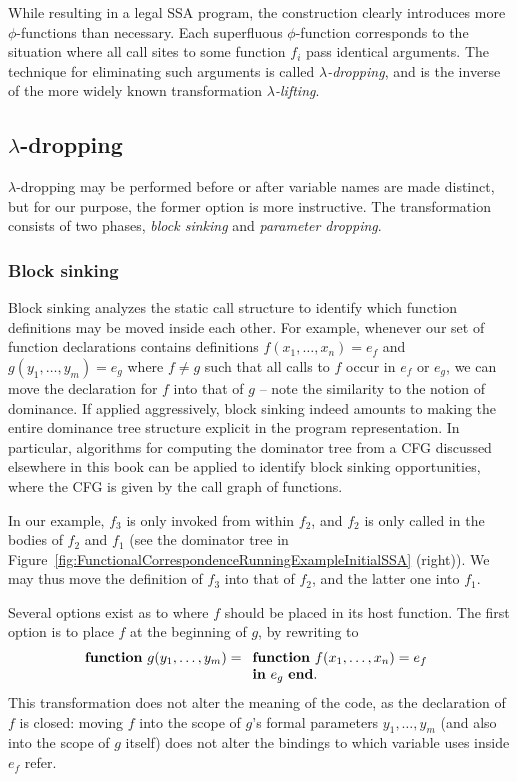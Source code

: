 {While resulting in a legal SSA program, the construction clearly
introduces more $\phi$-functions than necessary. Each superfluous
$\phi$-function corresponds to the situation where all call sites to
some function $f_i$ pass identical arguments. The technique for
eliminating such arguments is called
\emph{$\lambda$-dropping}, and is
the inverse of the more widely known transformation
\emph{$\lambda$-lifting}. 

\subsection{$\lambda$-dropping}
\label{section:Part1:Semantics:lambdaDropping}

$\lambda$-dropping may be performed before or after variable names are
made distinct, but for our purpose, the former option is more
instructive.  The transformation consists of two phases, \emph{block
sinking} and \emph{parameter dropping}.

\subsubsection{Block sinking}
\label{section:Part1:Semantics:lambdaDropping:blockSinking}
Block sinking analyzes the static call structure to identify which
function definitions may be moved inside each other. For example,
whenever our set of function declarations contains definitions $f
(x_1,\ldots,x_n) = e_f$ and $ g (y_1,\ldots,y_m) = e_g$ where $f \neq
g$ such that all calls to $f$ occur in $e_f$ or $e_g$, we can move the
declaration for $f$ into that of $g$ -- note the similarity to the
notion of dominance. If applied aggressively, block sinking indeed
amounts to making the entire dominance tree structure explicit in the
program representation. In particular, algorithms for computing the
dominator tree from a CFG discussed elsewhere in this book can be
applied to identify block sinking opportunities, where the CFG is
given by the call graph of functions.

In our example, $f_3$ is only invoked from within $f_2$, and $f_2$ is
only called in the bodies of $f_2$ and $f_1$ (see the dominator tree
in Figure~\ref{fig:FunctionalCorrespondenceRunningExampleInitialSSA}
(right)).  We may thus move the definition of $f_3$ into that of
$f_2$, and the latter one into $f_1$.

Several options exist as to where $f$ should be placed in its host
function. The first option is to place $f$ at the beginning of $g$,
by rewriting to 
$$\mathtt{function}\ g(y_1,\ldots,y_m) =
\begin{array}[t]{l} 
  \mathtt{function}\ f(x_1,\ldots,x_n) = e_f\\
  \mathtt{in}\ e_g\ \mathtt{end}.
\end{array}
$$ This transformation does not alter the meaning of the code, as the
declaration of $f$ is closed: moving $f$ into the scope of $g$'s
formal parameters $y_1,\ldots,y_m$ (and also into the scope of $g$
itself) does not alter the bindings to which variable uses inside
$e_f$ refer.

}

